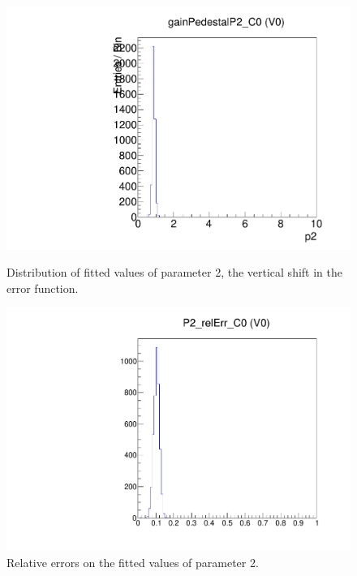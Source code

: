 \begin{figure}[!htp]
\centering
\begin{minipage}{0.45\textwidth}
  \includegraphics[width=1.0\textwidth]{figures/gainped_gainPedestalP2.pdf}
  \caption{Distribution of fitted values of parameter 2, the vertical shift in the error function.}
  \label{fig:gainped_gainPedestalP2}
\end{minipage}
\hspace{0.3cm}
\begin{minipage}{0.45\textwidth}
  \includegraphics[width=1.0\textwidth]{figures/gainped_P2_relErr.pdf}
  \caption{Relative errors on the fitted values of parameter 2.}
  \label{fig:gainped_P2_relErr}
\end{minipage}
\end{figure}

